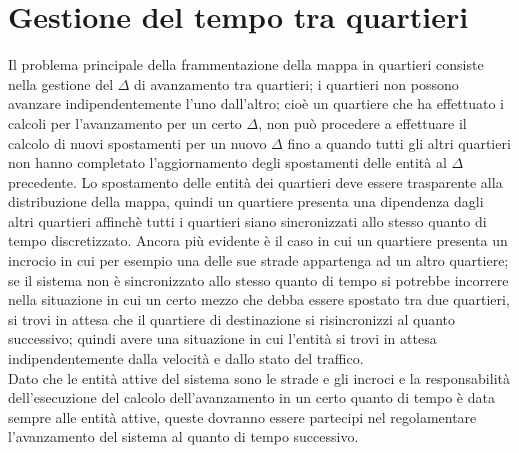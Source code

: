 \section{Gestione del tempo tra quartieri}
Il problema principale della frammentazione della mappa in quartieri consiste nella gestione del $\Delta$ di avanzamento tra quartieri; i quartieri non possono avanzare indipendentemente l'uno dall'altro; cioè un quartiere che ha effettuato i calcoli per l'avanzamento per un certo $\Delta$, non può procedere a effettuare il calcolo di nuovi spostamenti per un nuovo $\Delta$ fino a quando tutti gli altri quartieri non hanno completato l'aggiornamento degli spostamenti delle entità al $\Delta$ precedente. Lo spostamento delle entità dei quartieri deve essere trasparente alla distribuzione della mappa, quindi un quartiere presenta una dipendenza dagli altri quartieri affinchè tutti i quartieri siano sincronizzati allo stesso quanto di tempo discretizzato. Ancora più evidente è il caso in cui un quartiere presenta un incrocio in cui per esempio una delle sue strade appartenga ad un altro quartiere; se il sistema non è sincronizzato allo stesso quanto di tempo si potrebbe incorrere nella situazione in cui un certo mezzo che debba essere spostato tra due quartieri, si trovi in attesa che il quartiere di destinazione si risincronizzi al quanto successivo; quindi avere una situazione in cui l'entità si trovi in attesa indipendentemente dalla velocità e dallo stato del traffico.\\
Dato che le entità attive del sistema sono le strade e gli incroci e la responsabilità dell'esecuzione del calcolo dell'avanzamento in un certo quanto di tempo è data sempre alle entità attive, queste dovranno essere partecipi nel regolamentare l'avanzamento del sistema al quanto di tempo successivo.\\

